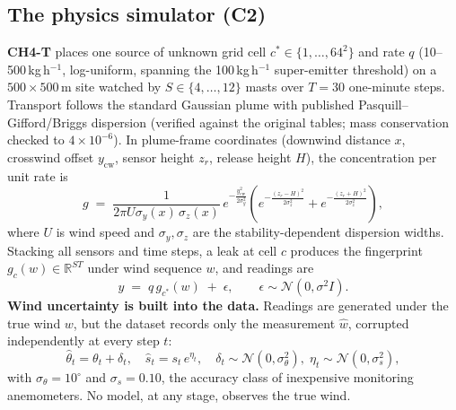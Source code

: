 \documentclass[conference]{IEEEtran}
\begin{document}
\subsection{The physics simulator (C2)}
\label{sec:forward}
\textbf{CH4-T} places one source of unknown grid cell
$c^\ast \in \{1,\dots,64^2\}$ and rate $q$
(10--500\,kg\,h$^{-1}$, log-uniform, spanning the 100\,kg\,h$^{-1}$
super-emitter threshold) on a $500{\times}500$\,m site watched by
$S \in \{4,\dots,12\}$ masts over $T{=}30$ one-minute steps. Transport
follows the standard Gaussian plume with published
Pasquill--Gifford/Briggs dispersion (verified against the original
tables; mass conservation checked to $4{\times}10^{-6}$). In plume-frame
coordinates (downwind distance $x$, crosswind offset $y_{\mathrm{cw}}$,
sensor height $z_r$, release height $H$), the concentration per unit rate
is
\begin{equation}
\label{eq:plume}
g \;=\; \frac{1}{2\pi U \sigma_y(x)\,\sigma_z(x)}\,
e^{-\frac{y_{\mathrm{cw}}^2}{2\sigma_y^2}}
\!\left(e^{-\frac{(z_r-H)^2}{2\sigma_z^2}}
      + e^{-\frac{(z_r+H)^2}{2\sigma_z^2}}\right),
\end{equation}
where $U$ is wind speed and $\sigma_y,\sigma_z$ are the
stability-dependent dispersion widths. Stacking all sensors and time
steps, a leak at cell $c$ produces the fingerprint
$g_c(w) \in \mathbb{R}^{ST}$ under wind sequence $w$, and readings are
\begin{equation}
\label{eq:readings}
y \;=\; q\, g_{c^\ast}(w) \;+\; \epsilon, \qquad
\epsilon \sim \mathcal{N}(0,\sigma^2 I).
\end{equation}
\textbf{Wind uncertainty is built into the data.} Readings are generated
under the true wind $w$, but the dataset records only the measurement
$\hat w$, corrupted independently at every step $t$:
\begin{equation}
\label{eq:winderr}
\hat\theta_t = \theta_t + \delta_t,\quad
\hat s_t = s_t\, e^{\eta_t},\quad
\delta_t \!\sim\! \mathcal{N}(0,\sigma_\theta^2),\;
\eta_t \!\sim\! \mathcal{N}(0,\sigma_s^2),
\end{equation}
with $\sigma_\theta = 10^\circ$ and $\sigma_s = 0.10$, the accuracy class
of inexpensive monitoring anemometers. No model, at any stage, observes
the true wind.
\end{document}
